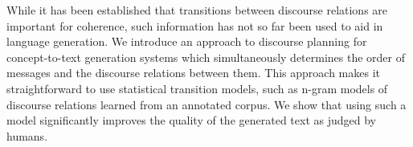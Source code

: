 While it has been established that transitions between discourse relations are important for coherence, such information has not so far been used to aid in language generation. We introduce an approach to discourse planning for concept-to-text generation systems which simultaneously determines the order of messages and the discourse relations between them. This approach makes it straightforward to use statistical transition models, such as n-gram models of discourse relations learned from an annotated corpus. We show that using such a model significantly improves the quality of the generated text as judged by humans.
